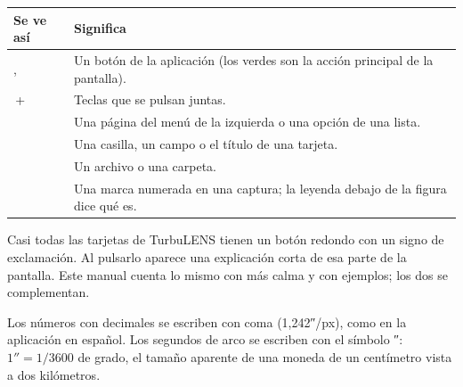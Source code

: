 \begin{center}\small
\begin{tabularx}{\linewidth}{@{}l Y@{}}
\toprule
Se ve así & Significa\\
\midrule
{},  & Un botón de la aplicación (los verdes son la acción principal de la pantalla).\\
\,+\, & Teclas que se pulsan juntas.\\
 & Una página del menú de la izquierda o una opción de una lista.\\
 & Una casilla, un campo o el título de una tarjeta.\\
 & Un archivo o una carpeta.\\
 & Una marca numerada en una captura; la leyenda debajo de la figura dice qué es.\\
\bottomrule
\end{tabularx}
\end{center}

\begin{nota}
Casi todas las tarjetas de TurbuLENS tienen un botón redondo con un signo de exclamación. Al pulsarlo aparece una
explicación corta de esa parte de la pantalla. Este manual cuenta lo mismo con más calma y con ejemplos; los dos se
complementan.
\end{nota}

Los números con decimales se escriben con coma (1,242″/px), como en la aplicación en español. Los segundos de arco se
escriben con el símbolo ″: $1'' = 1/3600$ de grado, el tamaño aparente de una moneda de un centímetro vista a dos
kilómetros.
